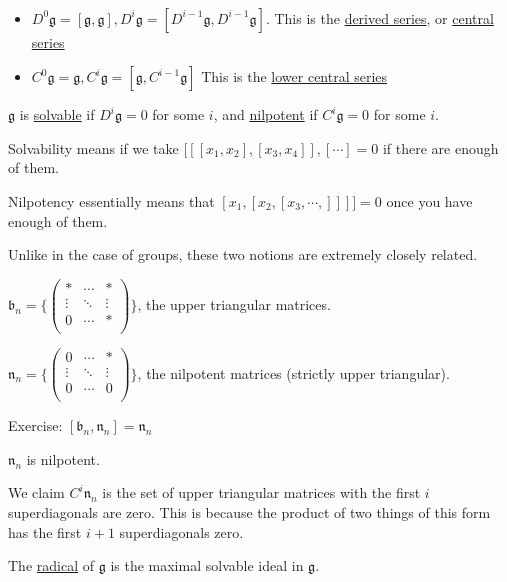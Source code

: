 \documentclass[x11names,reqno,14pt]{extarticle}
\newcommand{\mk}[1]{\mathfrak{#1}}
\newcommand{\g}{\mk{g}}
\begin{document}
\,
\begin{itemize}

\item $D^0\g = [\g,\g], D^i\g = [D^{i-1}\g,D^{i-1}\g]$. This is the \underline{derived series}, or \underline{central series}

\item $C^0\g = \g, C^i\g = [\g, C^{i-1}\g]$ This is the \underline{lower central series}

\end{itemize}


$\g$ is \underline{solvable} if $D^i\g = 0$ for some $i$, and \underline{nilpotent} if $C^i\g = 0$ for some $i$. 

Solvability means if we take $[[[x_1,x_2],[x_3,x_4]],[\cdots] = 0$ if there are enough of them.

Nilpotency essentially means that $[x_1,[x_2,[x_3,\cdots,]]]] = 0$ once you have enough of them.

Unlike in the case of groups, these two notions are extremely closely related. 

\exm

$\mk{b}_n = \{\begin{pmatrix} * & \cdots & * \\ \vdots & \ddots & \vdots \\ 0 & \cdots & * \\ \end{pmatrix}\}$, the upper triangular matrices.

$\mk{n}_n = \{\begin{pmatrix} 0 & \cdots & * \\ \vdots & \ddots & \vdots \\0 & \cdots & 0 \\ \end{pmatrix}\}$, the nilpotent matrices (strictly upper triangular). 

Exercise: $[\mk{b}_n,\mk{n}_n] = \mk{n}_n$

\prop

$\mk{n}_n$ is nilpotent. 

\proof

We claim $C^i\mk{n}_n$ is the set of upper triangular matrices with the first $i$ superdiagonals are zero. This is because the product of two things of this form has the first $i + 1$ superdiagonals zero. 


The \underline{radical} of $\g$ is the maximal solvable ideal in $\g$. 
\end{document}
